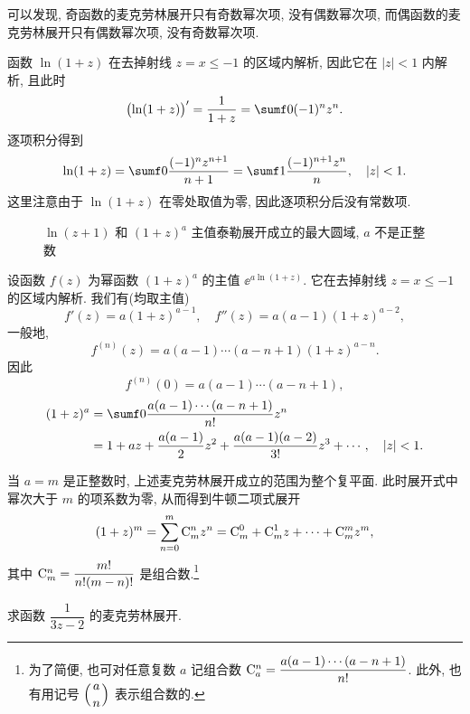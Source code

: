 可以发现, 奇函数的麦克劳林展开只有奇数幂次项, 没有偶数幂次项, 而偶函数的麦克劳林展开只有偶数幂次项, 没有奇数幂次项.

\begin{example}
  函数 $\ln(1+z)$ 在去掉射线 $z=x\le-1$ 的区域内解析, 因此它在 $|z|<1$ 内解析, 且此时
  \[
     \bigl(\ln(1+z)\bigr)'
    =\frac1{1+z}
    =\sumf0 (-1)^nz^n.
  \]
  逐项积分得到
  \[
     \ln(1+z)
    =\sumf0 \frac{(-1)^nz^{n+1}}{n+1}
    =\sumf1 \frac{(-1)^{n+1}z^n}{n},\quad|z|<1.
  \]
  这里注意由于 $\ln(1+z)$ 在零处取值为零, 因此逐项积分后没有常数项.
\end{example}

\begin{figure}[!htb]
  \centering
  \caption{$\ln(z+1)$ 和 $(1+z)^a$ 主值泰勒展开成立的最大圆域, $a$ 不是正整数}
\end{figure}

\begin{example}
  \label{exam:power-taylor-series}
  设函数 $f(z)$ 为幂函数 $(1+z)^a$ 的主值 $\ee^{a\ln(1+z)}$. 它在去掉射线 $z=x\le -1$ 的区域内解析.
  我们有(均取主值)
  \[
    f'(z)=a(1+z)^{a-1},\quad
    f''(z)=a (a-1)(1+z)^{a-2},
  \]
  一般地,
  \[
    f^{(n)}(z)=a(a-1)\cdots(a-n+1)(1+z)^{a-n}.
  \]
  因此
  \[
    f^{(n)}(0)=a(a-1)\cdots(a-n+1),
  \]
  \begin{align*}
     (1+z)^a&
    =\sumf0 \frac{a(a-1)\cdots(a-n+1)}{n!}z^n\\&
    =1+a z+\frac{a(a-1)}2z^2+\frac{a(a-1)(a-2)}{3!}z^3+\cdots,\quad |z|<1.
  \end{align*}
\end{example}

当 $a=m$ 是正整数时, 上述麦克劳林展开成立的范围为整个复平面.
此时展开式中幂次大于 $m$ 的项系数为零, 从而得到牛顿二项式展开
\[
   (1+z)^m
  =\sum_{n=0}^m {\mathrm{C}}_m^n z^n
  ={\mathrm{C}}_m^0+{\mathrm{C}}_m^1 z+\cdots+{\mathrm{C}}_m^m z^m,
\]
其中 ${\mathrm{C}}_m^n=\dfrac{m!}{n!(m-n)!}$ 是组合数.\footnote{
  为了简便, 也可对任意复数 $a$ 记组合数 ${\mathrm{C}}_a^n=\dfrac{a(a-1)\cdots(a-n+1)}{n!}$.
  此外, 也有用记号 $\Bigl(\genfrac{}{}{0pt}{0}an\Bigr)$ 表示组合数的.
}

\begin{example}
  求函数 $\dfrac1{3z-2}$ 的麦克劳林展开.
\end{example}

